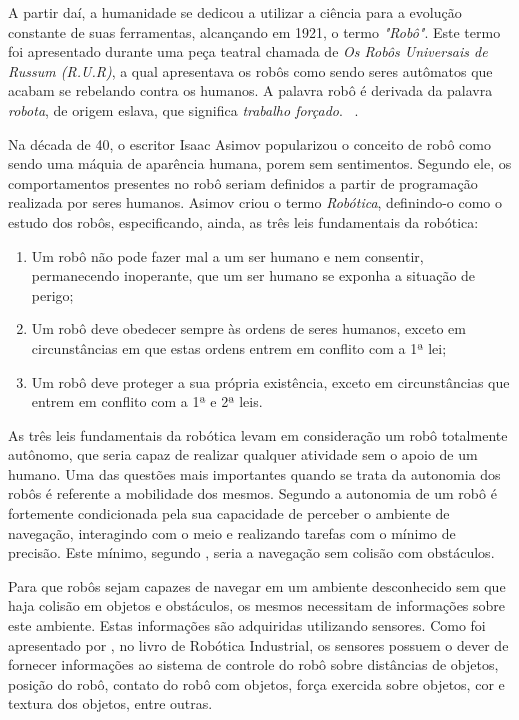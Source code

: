 	A partir daí, a humanidade se dedicou a utilizar a ciência para a evolução constante de suas ferramentas, alcançando em 1921, o termo \textit{"Robô"}. Este termo foi apresentado durante uma peça teatral chamada de \textit{Os Robôs Universais de Russum (R.U.R)}, a qual apresentava os robôs como sendo seres autômatos que acabam se rebelando contra os humanos. A palavra robô é derivada da palavra \textit{robota}, de origem eslava, que significa \textit{trabalho forçado}. ~\cite{roboticaIndustrial}.

	Na década de 40, o escritor Isaac Asimov popularizou o conceito de robô como sendo uma máquia de aparência humana, porem sem sentimentos. Segundo ele, os comportamentos presentes no robô seriam definidos a partir de programação realizada por seres humanos. Asimov criou o termo \textit{Robótica}, definindo-o como o estudo dos robôs, especificando, ainda, as três leis fundamentais da robótica:

	\begin{enumerate}
		\item Um robô não pode fazer mal a um ser humano e nem consentir, permanecendo inoperante,
 que um ser humano se exponha a situação de perigo; 
 		\item Um robô deve obedecer sempre às ordens de seres humanos, exceto em circunstâncias em
 que estas ordens entrem em conflito com a 1ª lei; 
 		\item Um robô deve proteger a sua própria existência, exceto em circunstâncias que entrem em
 conflito com a 1ª e 2ª leis.
	\end{enumerate}

	As três leis fundamentais da robótica levam em consideração um robô totalmente autônomo, que seria capaz de realizar qualquer atividade sem o apoio de um humano. Uma das questões mais importantes quando se trata da autonomia dos robôs é referente a mobilidade dos mesmos. Segundo \cite{localizacaoEMapeamentoPaulo} a autonomia de um robô é fortemente condicionada pela sua capacidade de perceber o ambiente de navegação, interagindo com o meio e realizando tarefas com o mínimo de precisão. Este mínimo, segundo \cite{localizacaoEMapeamentoPaulo}, seria a navegação sem colisão com obstáculos. 

	Para que robôs sejam capazes de navegar em um ambiente desconhecido sem que haja colisão em objetos e obstáculos, os mesmos necessitam de informações sobre este ambiente. Estas informações são adquiridas utilizando sensores. Como foi apresentado por \cite{interacaoRoboAmbiente}, no livro de Robótica Industrial, os sensores possuem o dever de fornecer informações ao sistema de controle do robô sobre distâncias de objetos, posição do robô, contato do robô com objetos, força exercida sobre objetos, cor e textura dos objetos, entre outras.

